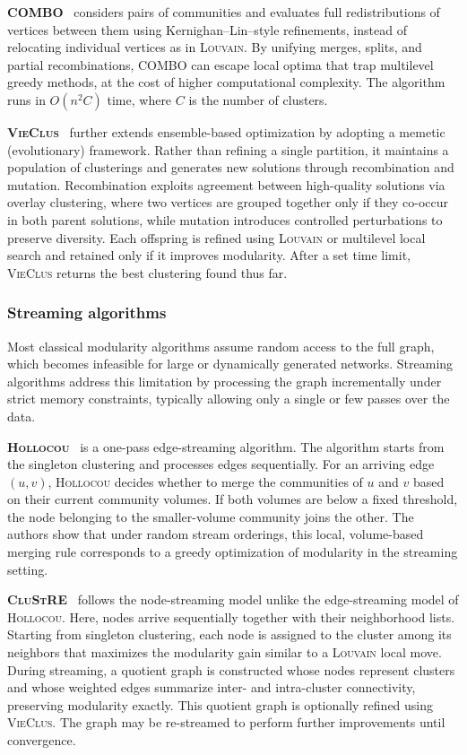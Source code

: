 \documentclass[../paper.tex]{subfiles}
\begin{document}
\textbf{\textsc{COMBO}}~\cite{combo2014} considers pairs of communities and evaluates full redistributions of vertices between them using Kernighan--Lin–style refinements, instead of relocating individual vertices as in \textsc{Louvain}.
By unifying merges, splits, and partial recombinations, \textsc{COMBO} can escape local optima that trap multilevel greedy methods, at the cost of higher computational complexity. The algorithm runs in $O(n^2 C)$ time, where $C$ is the number of clusters.

\textbf{\textsc{VieClus}}~\cite{vieclus2018} further extends ensemble-based optimization by adopting a memetic (evolutionary) framework.
Rather than refining a single partition, it maintains a population of clusterings and generates new solutions through recombination and mutation.
Recombination exploits agreement between high-quality solutions via overlay clustering, where two vertices are grouped together only if they co-occur in both parent solutions, while mutation introduces controlled perturbations to preserve diversity.
Each offspring is refined using \textsc{Louvain} or multilevel local search and retained only if it improves modularity. After a set time limit, \textsc{VieClus} returns the best clustering found thus far. 

\subsubsection{Streaming algorithms}

Most classical modularity algorithms assume random access to the full graph, which becomes infeasible for large or dynamically generated networks.
Streaming algorithms address this limitation by processing the graph incrementally under strict memory constraints, typically allowing only a single or few passes over the data.

\textbf{\textsc{Hollocou}}~\cite{hollocou2017} is a one-pass edge-streaming algorithm.
The algorithm starts from the singleton clustering and processes edges sequentially.
For an arriving edge $(u,v)$, \textsc{Hollocou} decides whether to merge the communities of $u$ and $v$ based on their current community volumes.
If both volumes are below a fixed threshold, the node belonging to the smaller-volume community joins the other.
The authors show that under random stream orderings, this local, volume-based merging rule corresponds to a greedy optimization of modularity in the streaming setting.

\textbf{\textsc{CluStRE}}~\cite{clustre2025} follows the node-streaming model unlike the edge-streaming model of \textsc{Hollocou}. Here, nodes arrive sequentially together with their neighborhood lists.
Starting from singleton clustering, each node is assigned to the cluster among its neighbors that maximizes the modularity gain similar to a \textsc{Louvain} local move.
During streaming, a quotient graph is constructed whose nodes represent clusters and whose weighted edges summarize inter- and intra-cluster connectivity, preserving modularity exactly.
This quotient graph is optionally refined using \textsc{VieClus}.
The graph may be re-streamed to perform further improvements until convergence.
\end{document}
